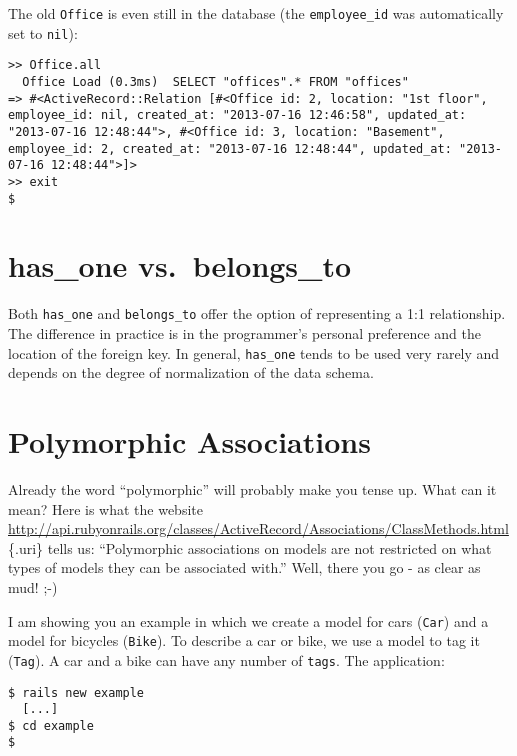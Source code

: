 \documentclass[a4paper]{book}
\newcounter{tab}[chapter]
\begin{document}
The old \texttt{Office} is even still in the database (the \texttt{employee\_id} was automatically set to \texttt{nil}):

\begin{shaded}\begin{verbatim}
>> Office.all
  Office Load (0.3ms)  SELECT "offices".* FROM "offices"
=> #<ActiveRecord::Relation [#<Office id: 2, location: "1st floor", employee_id: nil, created_at: "2013-07-16 12:46:58", updated_at: "2013-07-16 12:48:44">, #<Office id: 3, location: "Basement", employee_id: 2, created_at: "2013-07-16 12:48:44", updated_at: "2013-07-16 12:48:44">]>
>> exit
$
\end{verbatim}\end{shaded}

\section{has\_one vs.~belongs\_to}\label{hasux5fone-vs.belongsux5fto}

Both \texttt{has\_one} and \texttt{belongs\_to} offer the option of representing a 1:1 relationship. The difference in practice is in the programmer's personal preference and the location of the foreign key. In general, \texttt{has\_one} tends to be used very rarely and depends on the degree of normalization of the data schema.

\section{Polymorphic Associations}\label{polymorphic-associations}

Already the word “polymorphic” will probably make you tense up. What can it mean? Here is what the website \url{http://api.rubyonrails.org/classes/ActiveRecord/Associations/ClassMethods.html}\{.uri\} tells us: “Polymorphic associations on models are not restricted on what types of models they can be associated with.” Well, there you go - as clear as mud! ;-)

I am showing you an example in which we create a model for cars (\texttt{Car}) and a model for bicycles (\texttt{Bike}). To describe a car or bike, we use a model to tag it (\texttt{Tag}). A car and a bike can have any number of \texttt{tags}. The application:

\begin{shaded}\begin{verbatim}
$ rails new example
  [...]
$ cd example
$
\end{verbatim}\end{shaded}
\end{document}
